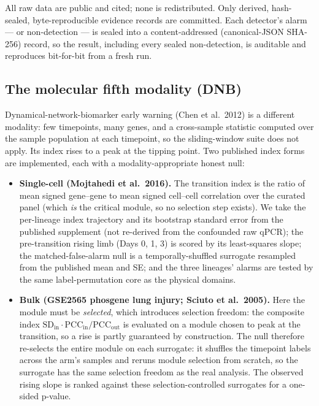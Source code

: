 \documentclass[aip,cha,preprint,amsmath,amssymb]{revtex4-2}
\begin{document}
All raw data are public and cited; none is redistributed. Only derived,
hash-sealed, byte-reproducible evidence records are committed. Each
detector's alarm --- or non-detection --- is sealed into a
content-addressed (canonical-JSON SHA-256) record, so the result,
including every sealed non-detection, is auditable and reproduces
bit-for-bit from a fresh run.

\subsection{The molecular fifth modality (DNB)}

Dynamical-network-biomarker early warning (Chen et al.\ 2012) is a
different modality: few timepoints, many genes, and a cross-sample
statistic computed over the sample population at each timepoint, so the
sliding-window suite does not apply. Its index rises to a peak at the
tipping point. Two published index forms are implemented, each with a
modality-appropriate honest null:

\begin{itemize}
  \item \textbf{Single-cell (Mojtahedi et al.\ 2016).} The transition
    index is the ratio of mean signed gene--gene to mean signed
    cell--cell correlation over the curated panel (which \emph{is} the
    critical module, so no selection step exists). We take the
    per-lineage index trajectory and its bootstrap standard error from
    the published supplement (not re-derived from the confounded raw
    qPCR); the pre-transition rising limb (Days 0, 1, 3) is scored by
    its least-squares slope; the matched-false-alarm null is a
    temporally-shuffled surrogate resampled from the published mean and
    SE; and the three lineages' alarms are tested by the same
    label-permutation core as the physical domains.
  \item \textbf{Bulk (GSE2565 phosgene lung injury; Sciuto et al.\ 2005).} Here the module
    must be \emph{selected}, which introduces selection freedom: the
    composite index
    $\mathrm{SD_{in}} \cdot \mathrm{PCC_{in}} / \mathrm{PCC_{out}}$ is
    evaluated on a module chosen to peak at the transition, so a rise
    is partly guaranteed by construction. The null therefore re-selects
    the entire module on each surrogate: it shuffles the timepoint
    labels across the arm's samples and reruns module selection from
    scratch, so the surrogate has the same selection freedom as the
    real analysis. The observed rising slope is ranked against these
    selection-controlled surrogates for a one-sided p-value.
\end{itemize}
\end{document}

